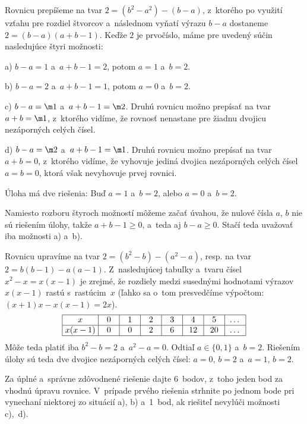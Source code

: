 {%
Rovnicu prepíšeme na tvar $2 = (b^2 - a^2 ) - (b - a)$,
z~ktorého po využití vzťahu pre rozdiel štvorcov a~následnom vyňatí
výrazu $b - a$ dostaneme  $2 = (b - a)(a + b - 1)$. Keďže $2$ je prvočíslo,
máme pre uvedený súčin nasledujúce štyri možnosti:

a)  $b - a= 1$ a~$a + b - 1 = 2$, potom $a = 1$ a~$b = 2$.

b)  $b - a= 2$ a~$a + b - 1 = 1$, potom $a = 0$ a~$b = 2$.

c)  $b - a= \m1$ a~$a + b - 1 = \m2$.
Druhú rovnicu možno prepísať na tvar $a + b = \m1$, z~ktorého vidíme, že
rovnosť nenastane pre žiadnu dvojicu nezáporných celých čísel.

d) $b - a= \m2$ a~$a + b - 1 = \m 1$.
Druhú rovnicu možno prepísať na tvar $a + b = 0$, z~ktorého vidíme, že
vyhovuje jediná dvojica nezáporných celých čísel $a=b=0$, ktorá
však nevyhovuje prvej rovnici.

\zaver
Úloha má dve riešenia: Buď $a = 1$ a~$b = 2$, alebo $a = 0$ a~$b =2$.

\poznamka
Namiesto rozboru štyroch možností môžeme začať úvahou, že %
nulové čísla $a$, $b$ nie sú riešením úlohy, takže $a+b-1\ge0$, a~teda aj $b-a\ge0$.
Stačí teda uvažovať iba možnosti a) a~b).


\ineriesenie
Rovnicu upravíme na tvar  $2 = (b^2 - b) - (a^2 - a)$, resp. na tvar
$2 = b({b - 1}) - a(a - 1)$. Z~nasledujúcej tabuľky a~tvaru čísel $x^2 - x = x(x - 1)$
je zrejmé, že rozdiely medzi susednými hodnotami výrazov $x(x - 1)$
rastú s~rastúcim~$x$ (ľahko sa o~tom presvedčíme výpočtom: $(x+1)x-x(x-1)=2x$).
$$
\vbox{\offinterlineskip \everycr{\noalign{\hrule}}
       \halign{\strut\vrule\ $#$ \vrule&&\hbox to 2.5em{\hss$#$\hss}\vrule\cr
x       & 0 & 1 & 2 & 3 &  4 &  5 &\dots\cr
x(x - 1)& 0 & 0 & 2 & 6 & 12 & 20 &\dots\cr
}}
$$
Môže teda platiť iba $b^2 - b = 2$ a~$a^2 - a= 0$.
Odtiaľ $a \in\{ 0,1\}$ a~$b = 2$. Riešením úlohy sú teda dve dvojice
nezáporných celých čísel: $a = 0$, $b = 2$ a~$a = 1$, $b =2$.


\nobreak\medskip\petit\noindent
Za úplné a~správne zdôvodnené riešenie dajte 6~bodov, z~toho
jeden bod za vhodnú úpravu rovnice. V~prípade prvého riešenia strhnite
po jednom bode pri vynechaní niektorej zo situácií a), b) a~1~bod, ak
riešiteľ nevylúči možnosti c),~d).

\endpetit
}

